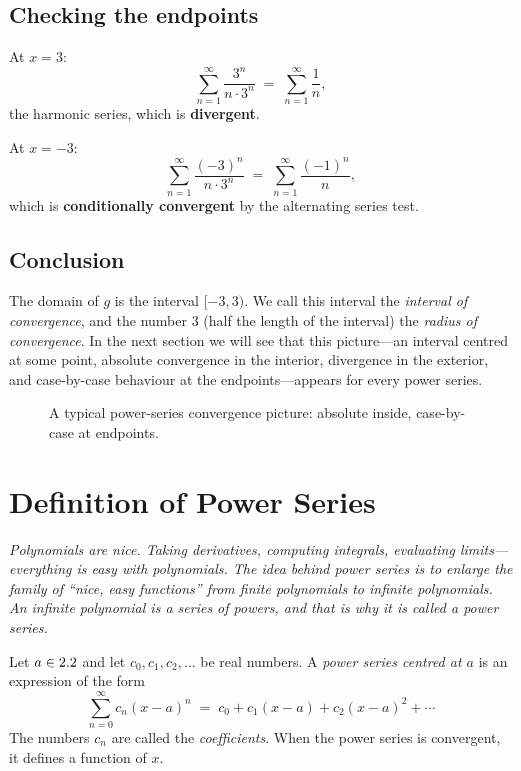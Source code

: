 \subsection*{Checking the endpoints}

At $x=3$:
\[
  \sum_{n=1}^{\infty}\frac{3^{n}}{n\cdot 3^{n}}
  \;=\; \sum_{n=1}^{\infty}\frac{1}{n},
\]
the harmonic series, which is \textbf{divergent}.

At $x=-3$:
\[
  \sum_{n=1}^{\infty}\frac{(-3)^{n}}{n\cdot 3^{n}}
  \;=\; \sum_{n=1}^{\infty}\frac{(-1)^{n}}{n},
\]
which is \textbf{conditionally convergent} by the alternating series test.

\subsection*{Conclusion}

The domain of $g$ is the interval $[-3,3)$.  We call this interval the \emph{interval of convergence}, and the number $3$ (half the length of the interval) the \emph{radius of convergence}.  In the next section we will see that this picture---an interval centred at some point, absolute convergence in the interior, divergence in the exterior, and case-by-case behaviour at the endpoints---appears for every power series.

\begin{figure}[ht]
  \centering
  
  \caption{A typical power-series convergence picture: absolute inside, case-by-case at endpoints.}
  \label{fig:motivating-example-interval}
\end{figure}

\section{Definition of Power Series}
\label{sec:14.2}

\textit{Polynomials are nice.  Taking derivatives, computing integrals, evaluating limits---everything is easy with polynomials.  The idea behind power series is to enlarge the family of ``nice, easy functions'' from finite polynomials to infinite polynomials.  An infinite polynomial is a series of powers, and that is why it is called a \emph{power series}.}

\begin{definition}
\label{def:14-1}
Let $a\in2.2$ and let $c_{0},c_{1},c_{2},\ldots$ be real numbers.  A \emph{power series centred at $a$} is an expression of the form
\[
  \sum_{n=0}^{\infty}c_{n}(x-a)^{n}
  \;=\; c_{0}+c_{1}(x-a)+c_{2}(x-a)^{2}+\cdots
\]
The numbers $c_{n}$ are called the \emph{coefficients}.  When the power series is convergent, it defines a function of $x$.
\end{definition}

